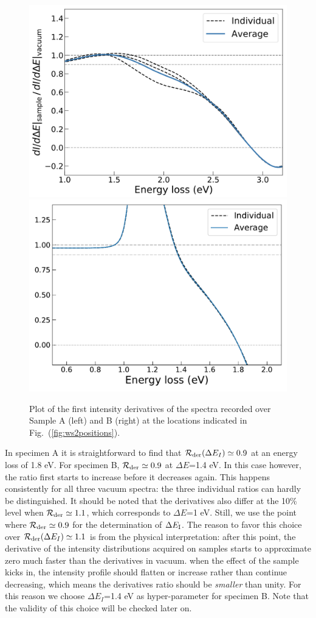 \begin{figure}[H]
\begin{centering}
  \includegraphics[width=0.49\linewidth]{plots/Derivatives_ratio_A.pdf}
  \includegraphics[width=0.49\linewidth]{plots/Derivatives_ratio_B.pdf}
  \caption{Plot of the first intensity derivatives of the spectra
  recorded over Sample A (left) and B (right) at the locations
  indicated in Fig.~(\ref{fig:ws2positions}).}
\label{fig:red}
\end{centering}
\end{figure}

In specimen A it is straightforward to find that $\mathcal{R}_{\rm der}(\Delta E_I) \simeq 0.9$
at an energy loss of 1.8 eV. 
%
For specimen B,  $\mathcal{R}_{\rm der} \simeq 0.9$ at $\Delta E$=1.4 eV.
%
In this case however, the ratio first starts to increase before it decreases again. 
%
This happens consistently for all three vacuum spectra: the three individual ratios can hardly
be distinguished. 
%
It should be noted that the derivatives also differ at the 10\% level when 
$\mathcal{R}_{\rm der} \simeq 1.1$, which corresponds to $\Delta E$=1 eV.
%
Still, we use the point where $\mathcal{R}_{\rm der} \simeq 0.9$
for the determination of $\Delta E_{\rm I}$.
%
The reason to favor this choice over $\mathcal{R}_{\rm der}(\Delta E_I) \simeq 1.1$ is from 
the physical interpretation: after this point,
the derivative of the intensity distributions acquired on samples starts 
to approximate zero much faster than the derivatives in vacuum.
%
when the effect of the sample kicks in, the intensity profile should flatten or increase rather than
continue decreasing, which means the derivatives ratio should be {\it smaller} than unity. 
%
For this reason we choose $\Delta E_I$=1.4 eV as hyper-parameter for specimen B. 
Note that the validity of this choice will be checked later on.\\

